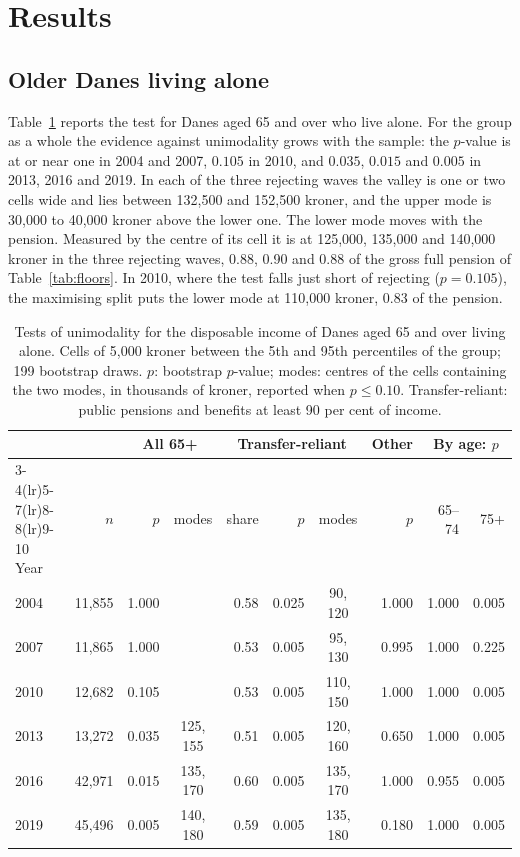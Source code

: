 \section{Results}\label{sec:results}

\subsection{Older Danes living alone}

Table~\ref{tab:dkold} reports the test for Danes aged 65 and over who live alone. For the group as a whole the evidence against unimodality grows with the sample: the $p$-value is at or near one in 2004 and 2007, $0.105$ in 2010, and $0.035$, $0.015$ and $0.005$ in 2013, 2016 and 2019. In each of the three rejecting waves the valley is one or two cells wide and lies between 132{,}500 and 152{,}500 kroner, and the upper mode is 30{,}000 to 40{,}000 kroner above the lower one. The lower mode moves with the pension. Measured by the centre of its cell it is at 125{,}000, 135{,}000 and 140{,}000 kroner in the three rejecting waves, 0.88, 0.90 and 0.88 of the gross full pension of Table~\ref{tab:floors}. In 2010, where the test falls just short of rejecting ($p=0.105$), the maximising split puts the lower mode at 110{,}000 kroner, 0.83 of the pension.

\begin{table}[t]
\centering\small
\caption{Tests of unimodality for the disposable income of Danes aged 65 and over living alone. Cells of 5{,}000 kroner between the 5th and 95th percentiles of the group; 199 bootstrap draws. $p$: bootstrap $p$-value; modes: centres of the cells containing the two modes, in thousands of kroner, reported when $p\le0.10$. Transfer-reliant: public pensions and benefits at least 90 per cent of income.}\label{tab:dkold}
\begin{tabular}{lrrcrrcrrr}
\toprule
 & & \multicolumn{2}{c}{All 65+} & \multicolumn{3}{c}{Transfer-reliant} & Other & \multicolumn{2}{c}{By age: $p$}\\
\cmidrule(lr){3-4}\cmidrule(lr){5-7}\cmidrule(lr){8-8}\cmidrule(lr){9-10}
Year & $n$ & $p$ & modes & share & $p$ & modes & $p$ & 65--74 & 75+\\
\midrule
2004 & 11{,}855 & 1.000 & & 0.58 & 0.025 & 90, 120 & 1.000 & 1.000 & 0.005\\
2007 & 11{,}865 & 1.000 & & 0.53 & 0.005 & 95, 130 & 0.995 & 1.000 & 0.225\\
2010 & 12{,}682 & 0.105 & & 0.53 & 0.005 & 110, 150 & 1.000 & 1.000 & 0.005\\
2013 & 13{,}272 & 0.035 & 125, 155 & 0.51 & 0.005 & 120, 160 & 0.650 & 1.000 & 0.005\\
2016 & 42{,}971 & 0.015 & 135, 170 & 0.60 & 0.005 & 135, 170 & 1.000 & 0.955 & 0.005\\
2019 & 45{,}496 & 0.005 & 140, 180 & 0.59 & 0.005 & 135, 180 & 0.180 & 1.000 & 0.005\\
\bottomrule
\end{tabular}
\end{table}

